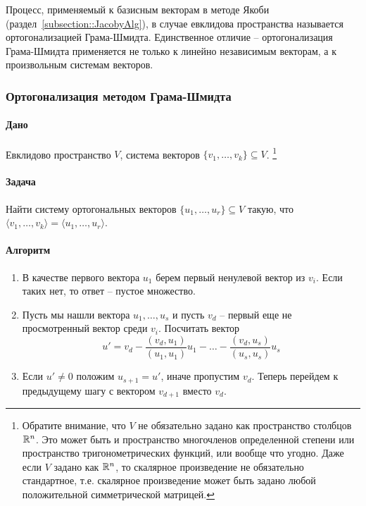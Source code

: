 Процесс, применяемый к базисным векторам в методе Якоби (раздел~\ref{subsection::JacobyAlg}), в случае евклидова пространства называется ортогонализацией Грама-Шмидта.
Единственное отличие -- ортогонализация Грама-Шмидта применяется не только к линейно независимым векторам, а к произвольным системам векторов.

\subsubsection*{Ортогонализация методом Грама-Шмидта}

\paragraph{Дано}

Евклидово пространство $V$, система векторов $\{v_1,\ldots,v_k\}\subseteq V$.%
\footnote{Обратите внимание, что $V$ не обязательно задано как пространство столбцов $\mathbb R^{n}$.
Это может быть и пространство многочленов определенной степени или пространство тригонометрических функций, или вообще что угодно.
Даже если $V$ задано как $\mathbb R^{n}$, то скалярное произведение не обязательно стандартное, т.е. скалярное произведение может быть задано любой положительной симметрической матрицей.}

\paragraph{Задача}

Найти систему ортогональных векторов $\{u_1,\ldots,u_r\}\subseteq V$ такую, что $\langle v_1,\ldots,v_k\rangle = \langle u_1,\ldots,u_r\rangle$.

\paragraph{Алгоритм}

\begin{enumerate}
\item В качестве первого вектора $u_1$ берем первый ненулевой вектор из $v_i$.
Если таких нет, то ответ -- пустое множество.

\item Пусть мы нашли вектора $u_1,\ldots,u_s$ и пусть $v_d$ -- первый еще не просмотренный вектор среди $v_i$.
Посчитать вектор 
\[
u' = v_d - \frac{(v_d, u_1)}{(u_1,u_1)} u_1 - \ldots - \frac{(v_d, u_s)}{(u_s, u_s)}u_s
\]

\item Если $u' \neq 0$ положим $u_{s+1} = u'$, иначе пропустим $v_d$.
Теперь перейдем к предыдущему шагу с вектором $v_{d+1}$ вместо $v_d$.
\end{enumerate}
